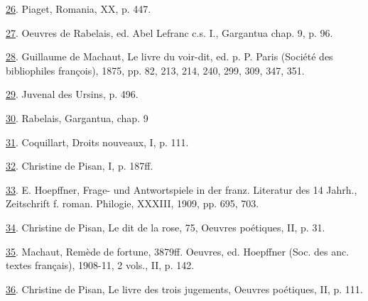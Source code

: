 \protect\hypertarget{23_NOTES.xhtmlux5cux23id_1437}{\protect\hyperlink{11_Chapter_Four__THE_FORMS_OF_LOVE.xhtmlux5cux23id_1436}{26}}.
Piaget, Romania, XX, p. 447.

\protect\hypertarget{23_NOTES.xhtmlux5cux23page_413}{\protect\hyperlink{11_Chapter_Four__THE_FORMS_OF_LOVE.xhtmlux5cux23id_1435}{27}}.
Oeuvres de Rabelais, ed. Abel Lefranc c.s. I., Gargantua chap. 9, p. 96.

\protect\hypertarget{23_NOTES.xhtmlux5cux23id_1434}{\protect\hyperlink{11_Chapter_Four__THE_FORMS_OF_LOVE.xhtmlux5cux23id_1433}{28}}.
Guillaume de Machaut, Le livre du voir-dit, ed. p. P. Paris (Société des
bibliophiles françois), 1875, pp. 82, 213, 214, 240, 299, 309, 347, 351.

\protect\hypertarget{23_NOTES.xhtmlux5cux23id_1432}{\protect\hyperlink{11_Chapter_Four__THE_FORMS_OF_LOVE.xhtmlux5cux23id_1431}{29}}.
Juvenal des Ursins, p. 496.

\protect\hypertarget{23_NOTES.xhtmlux5cux23id_1430}{\protect\hyperlink{11_Chapter_Four__THE_FORMS_OF_LOVE.xhtmlux5cux23id_1429}{30}}.
Rabelais, Gargantua, chap. 9

\protect\hypertarget{23_NOTES.xhtmlux5cux23id_1428}{\protect\hyperlink{11_Chapter_Four__THE_FORMS_OF_LOVE.xhtmlux5cux23id_1427}{31}}.
Coquillart, Droits nouveaux, I, p. 111.

\protect\hypertarget{23_NOTES.xhtmlux5cux23id_1426}{\protect\hyperlink{11_Chapter_Four__THE_FORMS_OF_LOVE.xhtmlux5cux23id_1425}{32}}.
Christine de Pisan, I, p. 187ff.

\protect\hypertarget{23_NOTES.xhtmlux5cux23id_1424}{\protect\hyperlink{11_Chapter_Four__THE_FORMS_OF_LOVE.xhtmlux5cux23id_1423}{33}}.
E. Hoepffner, Frage- und Antwortspiele in der franz. Literatur des 14
Jahrh., Zeitschrift f. roman. Philogie, XXXIII, 1909, pp. 695, 703.

\protect\hypertarget{23_NOTES.xhtmlux5cux23id_1422}{\protect\hyperlink{11_Chapter_Four__THE_FORMS_OF_LOVE.xhtmlux5cux23id_1421}{34}}.
Christine de Pisan, Le dit de la rose, 75, Oeuvres poétiques, II, p. 31.

\protect\hypertarget{23_NOTES.xhtmlux5cux23id_1420}{\protect\hyperlink{11_Chapter_Four__THE_FORMS_OF_LOVE.xhtmlux5cux23id_1419}{35}}.
Machaut, Remède de fortune, 3879ff. Oeuvres, ed. Hoepffner (Soc. des
anc. textes français), 1908-11, 2 vols., II, p. 142.

\protect\hypertarget{23_NOTES.xhtmlux5cux23id_1418}{\protect\hyperlink{11_Chapter_Four__THE_FORMS_OF_LOVE.xhtmlux5cux23id_1417}{36}}.
Christine de Pisan, Le livre des trois jugements, Oeuvres poétiques, II,
p. 111.

